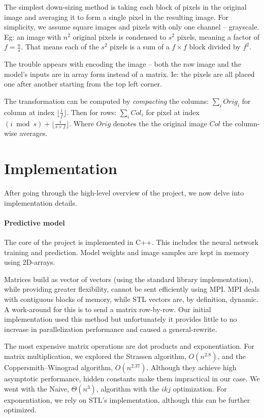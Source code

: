\documentclass[a4paper]{article}
\newcommand{\floor}[1]{\lfloor {#1} \rfloor}
\begin{document}
The simplest down-sizing method is taking each block of pixels in the original image and averaging it to form a single pixel in the resulting image. For simplicity, we assume square images and pixels with only one channel -- grayscale. Eg: an image with $n^2$ original pixels is condensed to $s^2$ pixels, meaning a factor of $f=\frac{n}{s}$. That means each of the $s^2$ pixels is a sum of a $f \times f$ block divided by $f^2$.

The trouble appears with encoding the image -- both the raw image and the model's inputs are in array form instead of a matrix. Ie: the pixels are all placed one after another starting from the top left corner.

The transformation can be computed by \textit{compacting} the columns:
$\sum_i Orig_i$ for column at index $\floor{\frac{i}{f}}$. Then for rows: $\sum_i Col_i$ for pixel at index $(i \bmod s) + \floor{\frac{i}{s \times f}}$. Where $Orig$ denotes the the original image $Col$ the column-wise averages. 







\newpage
\section{Implementation}
After going through the high-level overview of the project, we now delve into implementation details.

\paragraph{Predictive model} The core of the project is implemented in C++. This includes the neural network training and prediction. Model weights and image samples are kept in memory using 2D-arrays. 

Matrices build as vector of vectors (using the standard library implementation), while providing greater flexibility, cannot be sent efficiently using MPI. MPI deals with contiguous blocks of memory, while STL vectors are, by definition, dynamic. A work-around for this is to send a matrix row-by-row. Our initial implementation used this method but unfortunately it provides little to no increase in parallelization performance and caused a general-rewrite. 

The most expensive matrix operations are dot products and exponentiation. For matrix multiplication, we explored the Strassen algorithm, $O(n^{2.8})$, and the Coppersmith–Winograd algorithm, $O(n^{2.37})$. Although they achieve high asymptotic performance, hidden constants make them impractical in our case. We went with the Naive, $\Theta(n^3)$, algorithm with the $ikj$ optimization. For exponentiation, we rely on STL's implementation, although this can be further optimized.
\end{document}
